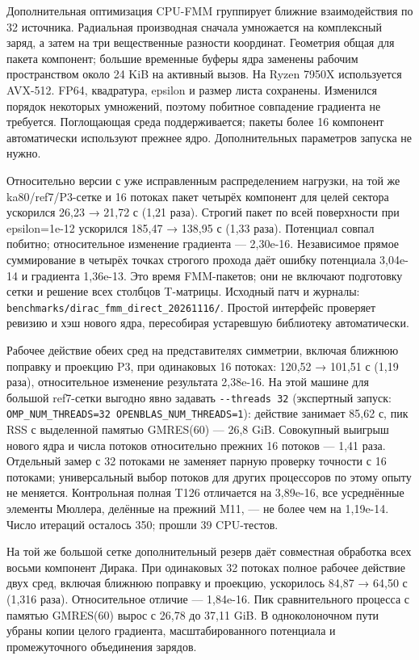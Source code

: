 \documentclass[
  russian,
  11pt,
  a4paper,
]{report}
\begin{document}
Дополнительная оптимизация CPU-FMM группирует ближние взаимодействия по
32 источника. Радиальная производная сначала умножается на комплексный
заряд, а затем на три вещественные разности координат. Геометрия общая
для пакета компонент; большие временные буферы ядра заменены рабочим
пространством около 24 KiB на активный вызов. На Ryzen 7950X
используется AVX-512. FP64, квадратура, epsilon и размер листа
сохранены. Изменился порядок некоторых умножений, поэтому побитное
совпадение градиента не требуется. Поглощающая среда поддерживается;
пакеты более 16 компонент автоматически используют прежнее ядро.
Дополнительных параметров запуска не нужно.

Относительно версии с уже исправленным распределением нагрузки, на той
же ka80/ref7/P3-сетке и 16 потоках пакет четырёх компонент для целей
сектора ускорился 26,23 → 21,72 с (1,21 раза). Строгий пакет по всей
поверхности при epsilon=1e-12 ускорился 185,47 → 138,95 с (1,33 раза).
Потенциал совпал побитно; относительное изменение градиента ---
2,30e-16. Независимое прямое суммирование в четырёх точках строгого
прохода даёт ошибку потенциала 3,04e-14 и градиента 1,36e-13. Это время
FMM-пакетов; они не включают подготовку сетки и решение всех столбцов
T-матрицы. Исходный патч и журналы:
\nolinkurl{benchmarks/dirac_fmm_direct_20261116/}. Простой интерфейс
проверяет ревизию и хэш нового ядра, пересобирая устаревшую библиотеку
автоматически.

Рабочее действие обеих сред на представителях симметрии, включая ближнюю
поправку и проекцию P3, при одинаковых 16 потоках: 120,52 → 101,51 с
(1,19 раза), относительное изменение результата 2,38e-16. На этой машине
для большой ref7-сетки выгодно явно задавать \nolinkurl{--threads 32}
(экспертный запуск:
\nolinkurl{OMP_NUM_THREADS=32 OPENBLAS_NUM_THREADS=1}): действие
занимает 85,62 с, пик RSS с выделенной памятью GMRES(60) --- 26,8 GiB.
Совокупный выигрыш нового ядра и числа потоков относительно прежних 16
потоков --- 1,41 раза. Отдельный замер с 32 потоками не заменяет парную
проверку точности с 16 потоками; универсальный выбор потоков для других
процессоров по этому опыту не меняется. Контрольная полная T126
отличается на 3,89e-16, все усреднённые элементы Мюллера, делённые на
прежний M11, --- не более чем на 1,19e-14. Число итераций осталось 350;
прошли 39 CPU-тестов.

На той же большой сетке дополнительный резерв даёт совместная обработка
всех восьми компонент Дирака. При одинаковых 32 потоках полное рабочее
действие двух сред, включая ближнюю поправку и проекцию, ускорилось
84,87 → 64,50 с (1,316 раза). Относительное отличие --- 1,84e-16. Пик
сравнительного процесса с памятью GMRES(60) вырос с 26,78 до 37,11 GiB.
В одноколоночном пути убраны копии целого градиента, масштабированного
потенциала и промежуточного объединения зарядов.
\end{document}
